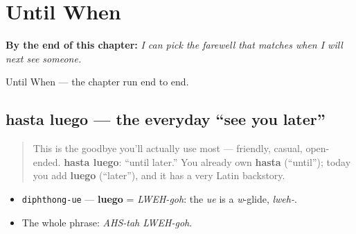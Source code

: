 
\chapter{Until When}
\label{ch:until-when}

\begin{chapteropening}
\textbf{By the end of this chapter:} \emph{I can pick the farewell that matches when I will next see someone.}

Until When — the chapter run end to end.
\end{chapteropening}

\section[hasta luego]{hasta luego — the everyday \textquotedblleft{}see you later\textquotedblright{}}

\label{lesson:ES-C05-hasta-luego}



\begin{quote}
This is the goodbye you'll actually use most — friendly, casual, open-ended. \textbf{hasta luego}: \textquotedblleft{}until later.\textquotedblright{} You already own \textbf{hasta} (\textquotedblleft{}until\textquotedblright{}); today you add \textbf{luego} (\textquotedblleft{}later\textquotedblright{}), and it has a very Latin backstory.
\end{quote}

\begin{sounds}
\begin{itemize}
\raggedright
  \item \texttt{diphthong-ue} — \textbf{luego} = \emph{LWEH-goh}: the \emph{ue} is a \emph{w}-glide, \emph{lweh-}.
  \item The whole phrase: \emph{AHS-tah LWEH-goh}.
\end{itemize}
\end{sounds}

